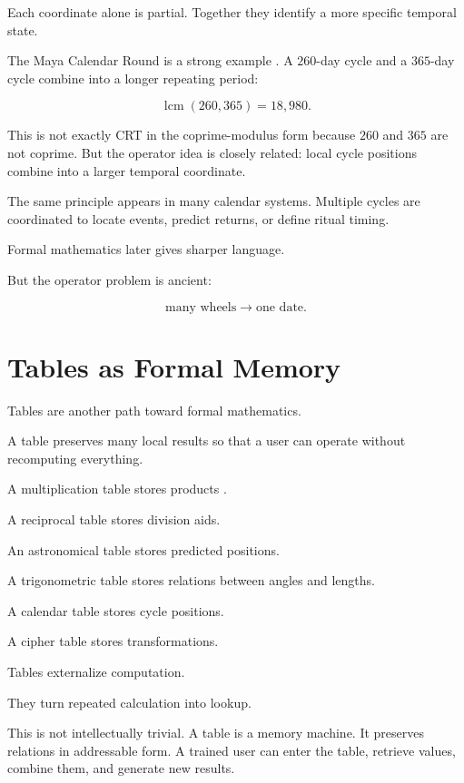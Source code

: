\documentclass[11pt]{book}
\begin{document}
Each coordinate alone is partial. Together they identify a more specific temporal state.

The Maya Calendar Round is a strong example \cite{BrickerBricker2011AstronomyMayaCodices,Thompson1950MayaHieroglyphicWriting,Coe2011Maya}. A \(260\)-day cycle and a \(365\)-day cycle combine into a longer repeating period:

\[
\operatorname{lcm}(260,365)=18{,}980.
\]

This is not exactly CRT in the coprime-modulus form because \(260\) and \(365\) are not coprime. But the operator idea is closely related: local cycle positions combine into a larger temporal coordinate.

The same principle appears in many calendar systems. Multiple cycles are coordinated to locate events, predict returns, or define ritual timing.

Formal mathematics later gives sharper language.

But the operator problem is ancient:

\[
\text{many wheels} \rightarrow \text{one date}.
\]

\section{Tables as Formal Memory}

Tables are another path toward formal mathematics.

A table preserves many local results so that a user can operate without recomputing everything.

A multiplication table stores products \cite{Neugebauer1957ExactSciences,Robson2008MathematicsAncientIraq,HungerPingree1999AstralSciences}.

A reciprocal table stores division aids.

An astronomical table stores predicted positions.

A trigonometric table stores relations between angles and lengths.

A calendar table stores cycle positions.

A cipher table stores transformations.

Tables externalize computation.

They turn repeated calculation into lookup.

This is not intellectually trivial. A table is a memory machine. It preserves relations in addressable form. A trained user can enter the table, retrieve values, combine them, and generate new results.
\end{document}

